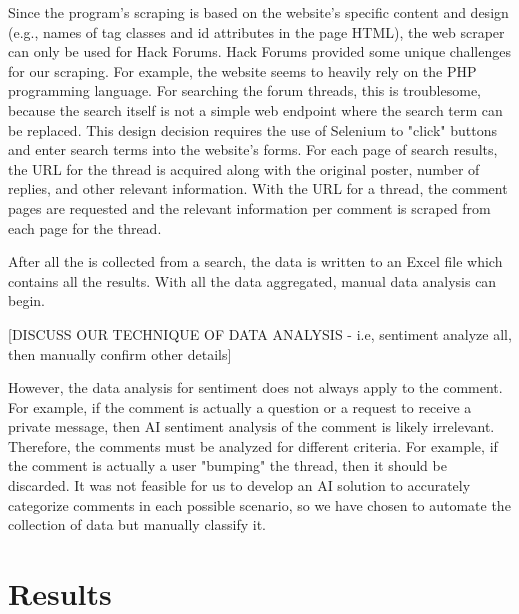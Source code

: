 \documentclass[sigconf]{acmart}
\begin{document}
Since the program's scraping is based on the website's specific content and 
design (e.g., names of tag classes and id attributes in the page HTML), the web
scraper can only be used for Hack Forums. Hack Forums provided some unique
challenges for our scraping. For example, the website seems to heavily rely
on the PHP programming language. For searching the forum threads, this is 
troublesome, because the search itself is not a simple web endpoint where the 
search term can be replaced. This design decision requires the use of Selenium
to "click" buttons and enter search terms into the website's forms. For each
page of search results, the URL for the thread is acquired along with the 
original poster, number of replies, and other relevant information. With the 
URL for a thread, the comment pages are requested and the relevant information
per comment is scraped from each page for the thread.

After all the is collected from a search, the data is written to an Excel file
which contains all the results. With all the data aggregated, manual data
analysis can begin.


[DISCUSS OUR TECHNIQUE OF DATA ANALYSIS - i.e, sentiment analyze all, then manually confirm other details]

However, the data analysis for sentiment does not always apply to the comment.
For example, if the comment is actually a question or a request to receive a 
private message, then AI sentiment analysis of the comment is likely irrelevant.
Therefore, the comments must be analyzed for different criteria. For example, 
if the comment is actually a user "bumping" the thread, then it should be 
discarded. It was not feasible for us to develop an AI solution to accurately
categorize comments in each possible scenario, so we have chosen to automate
the collection of data but manually classify it.

\section{Results}


\end{document}
